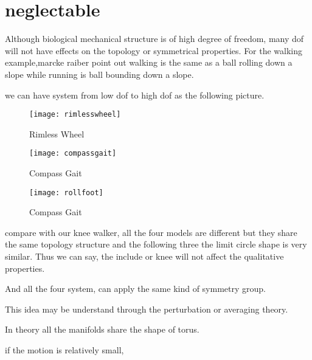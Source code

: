 \section{neglectable}
Although biological mechanical structure is of high degree of freedom, many dof will not have effects on the topology or symmetrical properties.
For the walking example,marcke raiber\citet{Raibert1986} point out walking is the same as a ball rolling down a slope while running is ball bounding down a slope.


we can have system from low dof to high dof as the following picture.
\begin{itemize}
\end{itemize}


\begin{figure}[!htbp]
  \begin{center}
    \texttt{[image: rimlesswheel]}
    \caption{Rimless Wheel}
    \label{fig:rimlesswheel}
\end{center}
\end{figure}


\begin{figure}[!htbp]
  \begin{center}
      \texttt{[image: compassgait]}
    \caption{Compass Gait}
    \label{fig:compassgait}
\end{center}
\end{figure}


\begin{figure}[!htbp]
  \begin{center}
      \texttt{[image: rollfoot]}
    \caption{Compass Gait}
    \label{fig:compassgait}
\end{center}
\end{figure}


compare with our knee walker, all the four models are different but they share the same topology structure and the following three the limit circle shape is very similar.
Thus we can say, the include or knee will not affect the qualitative properties.


And all the four system, can apply the same kind of symmetry group.


This idea may be understand through the perturbation or averaging theory.

In theory all the manifolds share the shape of torus.

if the motion is relatively small,

